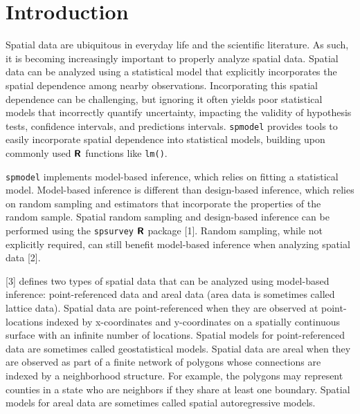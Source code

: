 \documentclass[10pt,letterpaper]{article}
\begin{document}
\linenumbers

\hypertarget{sec:introduction}{%
\section{Introduction}\label{sec:introduction}}

Spatial data are ubiquitous in everyday life and the scientific
literature. As such, it is becoming increasingly important to properly
analyze spatial data. Spatial data can be analyzed using a statistical
model that explicitly incorporates the spatial dependence among nearby
observations. Incorporating this spatial dependence can be challenging,
but ignoring it often yields poor statistical models that incorrectly
quantify uncertainty, impacting the validity of hypothesis tests,
confidence intervals, and predictions intervals. \texttt{spmodel}
provides tools to easily incorporate spatial dependence into statistical
models, building upon commonly used \(\textbf{\textsf{R}}\) functions
like \texttt{lm()}.

\texttt{spmodel} implements model-based inference, which relies on
fitting a statistical model. Model-based inference is different than
design-based inference, which relies on random sampling and estimators
that incorporate the properties of the random sample. Spatial random
sampling and design-based inference can be performed using the
\texttt{spsurvey} \(\textbf{\textsf{R}}\) package {[}1{]}. Random
sampling, while not explicitly required, can still benefit model-based
inference when analyzing spatial data {[}2{]}.

{[}3{]} defines two types of spatial data that can be analyzed using
model-based inference: point-referenced data and areal data (area data
is sometimes called lattice data). Spatial data are point-referenced
when they are observed at point-locations indexed by x-coordinates and
y-coordinates on a spatially continuous surface with an infinite number
of locations. Spatial models for point-referenced data are sometimes
called geostatistical models. Spatial data are areal when they are
observed as part of a finite network of polygons whose connections are
indexed by a neighborhood structure. For example, the polygons may
represent counties in a state who are neighbors if they share at least
one boundary. Spatial models for areal data are sometimes called spatial
autoregressive models.
\end{document}
